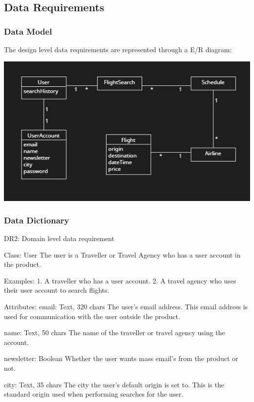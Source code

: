 \subsection{Data Requirements}

\subsubsection{Data Model}
The design level data requirements are represented through a E/R diagram:

\includegraphics{resources/dataRelations.PNG}

\subsubsection{Data Dictionary}

DR2: Domain level data requirement

Class: User
The user is a Traveller or Travel Agency who has a user account in the product.

Examples:
1. A traveller who has a user account.
2. A travel agency who uses their user account to search flights.

Attributes:
email:      Text, 320 chars
            The user's email address. This email address is used for communication with the user outside the product.

name:       Text, 50 chars
            The name of the traveller or travel agency using the account.

newsletter: Boolean
            Whether the user wants mass email's from the product or not.

city:       Text, 35 chars
            The city the user's default origin is set to. This is the standard origin used when performing searches for the user.

